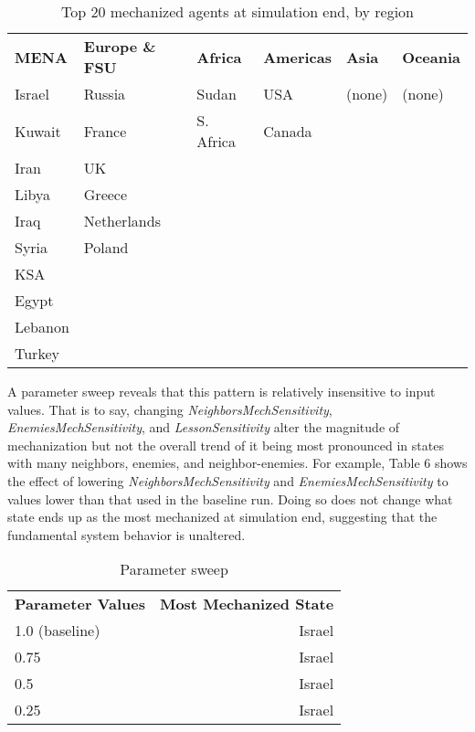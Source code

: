 \documentclass{article}
\begin{document}
\begin{table}[h]
	\centering
	\caption{Top 20 mechanized agents at simulation end, by region}
	\begin{tabular}{|l l l l l l|}
		\hline
		\textbf{MENA} & \textbf{Europe \& FSU} & \textbf{Africa} & \textbf{Americas} & \textbf{Asia} & \textbf{Oceania} \\
		Israel       & Russia         & Sudan        & USA    & (none) & (none) \\
		Kuwait       & France         & S. Africa    & Canada &        &        \\
		Iran         & UK             &              &        &        &        \\
		Libya        & Greece         &              &        &        &        \\
		Iraq         & Netherlands    &              &        &        &        \\
		Syria        & Poland         &              &        &        &        \\
		KSA          &                &              &        &        &        \\
		Egypt        &                &              &        &        &        \\
		Lebanon      &                &              &        &        &        \\
		Turkey       &                &              &        &        &        \\
		\hline
	\end{tabular}
\end{table}

A parameter sweep reveals that this pattern is relatively insensitive
to input values. That is to say, changing \textit{NeighborsMechSensitivity}, 
\textit{EnemiesMechSensitivity}, and \textit{LessonSensitivity} alter the
magnitude of mechanization but not the overall trend of it being most pronounced
in states with many neighbors, enemies, and neighbor-enemies. For example, Table
6 shows the effect of lowering \textit{NeighborsMechSensitivity} and 
\textit{EnemiesMechSensitivity} to values lower than that used in the baseline
run. Doing so does not change what state ends up as the most mechanized at
simulation end, suggesting that the fundamental system behavior is unaltered. 

\begin{table}[h]
	\centering
	\caption{Parameter sweep}
	\begin{tabular}{|l r|}
		\hline
		\textbf{Parameter Values} & \textbf{Most Mechanized State} \\ 
		1.0 (baseline) & Israel \\
		0.75 & Israel \\
		0.5 & Israel \\
		0.25 & Israel \\
		\hline
	\end{tabular}
\end{table}
\end{document}
